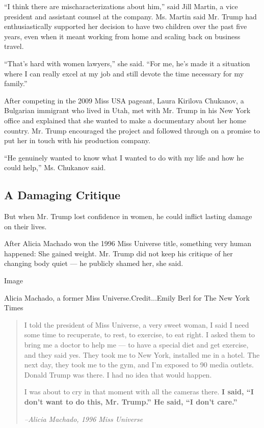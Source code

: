 ``I think there are mischaracterizations about him,'' said Jill Martin,
a vice president and assistant counsel at the company. Ms. Martin said
Mr. Trump had enthusiastically supported her decision to have two
children over the past five years, even when it meant working from home
and scaling back on business travel.

``That's hard with women lawyers,'' she said. ``For me, he's made it a
situation where I can really excel at my job and still devote the time
necessary for my family.''

After competing in the 2009 Miss USA pageant, Laura Kirilova Chukanov, a
Bulgarian immigrant who lived in Utah, met with Mr. Trump in his New
York office and explained that she wanted to make a documentary about
her home country. Mr. Trump encouraged the project and followed through
on a promise to put her in touch with his production company.

``He genuinely wanted to know what I wanted to do with my life and how
he could help,'' Ms. Chukanov said.

\hypertarget{a-damaging-critique}{%
\subsection{A Damaging Critique}\label{a-damaging-critique}}

But when Mr. Trump lost confidence in women, he could inflict lasting
damage on their lives.

After Alicia Machado won the 1996 Miss Universe title, something very
human happened: She gained weight. Mr. Trump did not keep his critique
of her changing body quiet --- he publicly shamed her, she said.

Image

Alicia Machado, a former Miss Universe.Credit...Emily Berl for The New
York Times

\begin{quote}
I told the president of Miss Universe, a very sweet woman, I said I need
some time to recuperate, to rest, to exercise, to eat right. I asked
them to bring me a doctor to help me --- to have a special diet and get
exercise, and they said yes. They took me to New York, installed me in a
hotel. The next day, they took me to the gym, and I'm exposed to 90
media outlets. Donald Trump was there. I had no idea that would happen.

I was about to cry in that moment with all the cameras there. \textbf{I
said, ``I don't want to do this, Mr. Trump.'' He said, ``I don't
care.''}

\emph{--Alicia Machado, 1996 Miss Universe}
\end{quote}

